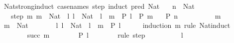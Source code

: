 \begin{isabellebody}
\endisatagproof
{\isafoldproof}%
%
\isadelimproof
%
\endisadelimproof
%
\isadelimdocument
%
\endisadelimdocument
%
\isatagdocument
%
\isamarkuptrue%
%
\endisatagdocument
{\isafolddocument}%
%
\isadelimdocument
%
\endisadelimdocument
{}\isamarkupfalse%
\ Nat{\isacharunderscore}{\kern0pt}strong{\isacharunderscore}{\kern0pt}induct\ {\isacharbrackleft}{\kern0pt}case{\isacharunderscore}{\kern0pt}names\ step{\isacharcomma}{\kern0pt}\ induct\ pred{\isacharcolon}{\kern0pt}\ Nat{\isacharbrackright}{\kern0pt}{\isacharcolon}{\kern0pt}\isanewline
\ \ \ {\isachardoublequoteopen}n\ {\isacharcolon}{\kern0pt}\ Nat{\isachardoublequoteclose}\isanewline
\ \ \ step{\isacharcolon}{\kern0pt}\ {\isachardoublequoteopen}{\isasymAnd}m{\isachardot}{\kern0pt}\ m\ {\isacharcolon}{\kern0pt}\ Nat\ {\isasymLongrightarrow}\ {\isacharparenleft}{\kern0pt}{\isasymAnd}l{\isachardot}{\kern0pt}\ l\ {\isacharcolon}{\kern0pt}\ Nat\ {\isasymLongrightarrow}\ l\ {\isacharless}{\kern0pt}\ m\ {\isasymLongrightarrow}\ P\ l{\isacharparenright}{\kern0pt}\ {\isasymLongrightarrow}\ P\ m{\isachardoublequoteclose}\isanewline
\ \ \ {\isachardoublequoteopen}P\ n{\isachardoublequoteclose}\isanewline
%
\isadelimproof
%
\endisadelimproof
%
\isatagproof
{}\isamarkupfalse%
\ {\isacharminus}{\kern0pt}\isanewline
\ \ \isacommand{{\isacharbraceleft}{\kern0pt}}\isamarkupfalse%
\isanewline
\ \ \ \ \isamarkupfalse%
\ m\ \isamarkupfalse%
\ {\isachardoublequoteopen}m\ {\isacharcolon}{\kern0pt}\ Nat{\isachardoublequoteclose}\isanewline
\ \ \ \ \isamarkupfalse%
\ \isamarkupfalse%
\ {\isachardoublequoteopen}{\isasymAnd}l{\isachardot}{\kern0pt}\ l\ {\isacharcolon}{\kern0pt}\ Nat\ {\isasymLongrightarrow}\ l\ {\isacharless}{\kern0pt}\ m\ {\isasymLongrightarrow}\ P\ l{\isachardoublequoteclose}\isanewline
\ \ \ \ \isamarkupfalse%
\ {\isacharparenleft}{\kern0pt}induction\ m\ rule{\isacharcolon}{\kern0pt}\ Nat{\isacharunderscore}{\kern0pt}induct{\isacharparenright}{\kern0pt}\isanewline
\ \ \ \ \ \ \isamarkupfalse%
\ {\isacharparenleft}{\kern0pt}succ\ m{\isacharparenright}{\kern0pt}\isanewline
\ \ \ \ \ \ \isamarkupfalse%
\ {\isachardoublequoteopen}P\ l{\isachardoublequoteclose}\isanewline
\ \ \ \ \ \ \isamarkupfalse%
\ {\isacharparenleft}{\kern0pt}rule\ step{\isacharparenright}{\kern0pt}\isanewline
\ \ \ \ \ \ \ \ \isamarkupfalse%
\ l{\isacharprime}{\kern0pt}\ \isamarkupfalse%

\end{isabellebody}
